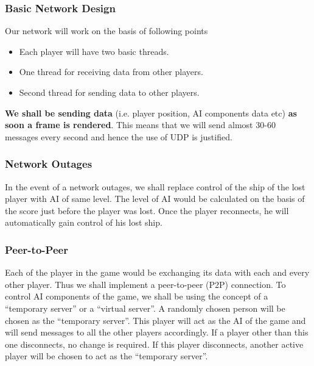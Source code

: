 \documentclass{article}
\begin{document}
				\subsubsection{Basic Network Design}
					Our network will work on the basis of following points
						\begin{itemize}
							\item Each player will have two basic threads.
							\item One thread for receiving data from other players.
							\item Second thread for sending data to other players.
						\end{itemize}
					\textbf{We shall be sending data} (i.e. player position, AI components data etc) \textbf{as soon a frame is rendered}. This means that we will send almost 30-60 messages every second and hence the use of UDP is justified.
				\subsubsection{Network Outages}
					In the event of a network outages, we shall replace control of the ship of the lost player with AI of same level. The level of AI would be calculated on the basis of the score just before the player was lost. Once the player reconnects, he will automatically gain control of his lost ship.
				\subsubsection{Peer-to-Peer}
					Each of the player in the game would be exchanging its data with each and every other player. Thus we shall implement a peer-to-peer (P2P) connection.
					To control AI components of the game, we shall be using the concept of a ``temporary server'' or a ``virtual server''. A randomly chosen person will be chosen as the ``temporary server''. This player will act as the AI of the game and will send messages to all the other players accordingly. If a player other than this one disconnects, no change is required. If this player disconnects, another active player will be chosen to act as the ``temporary server''.
\end{document}

